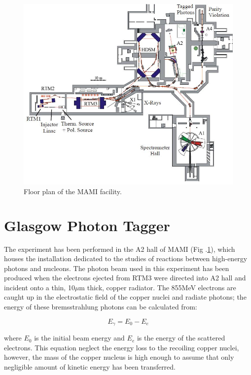 \begin{figure}[H]
\begin{center}
\includegraphics[scale=0.5]{mamifloor.jpg}
\caption{Floor plan of the MAMI facility.}
\label{mamifloor}
\end{center}
\end{figure}

\section{Glasgow Photon Tagger}

\indent The experiment has been performed in the A2 hall of MAMI (Fig .\ref{mamifloor}), which houses the installation dedicated to the studies of reactions between high-energy photons and nucleons. The photon beam used in this experiment has been produced when the electrons ejected from RTM3 were directed into A2 hall and incident onto a thin, 10$\mu$m thick, copper radiator. The 855MeV electrons are caught up in the electrostatic field of the copper nuclei and radiate photons; the energy of these bremsstrahlung photons can be calculated from:

\begin{equation}
E_{\gamma}=E_{0}-E_{e}
\end{equation}

where $E_{0}$ is the initial beam energy and $E_{e}$ is the energy of the scattered electrons. This equation neglect the energy loss to the recoiling copper nuclei, however, the mass of the copper nucleus is high enough to assume that only negligible amount of kinetic energy has been transferred.

